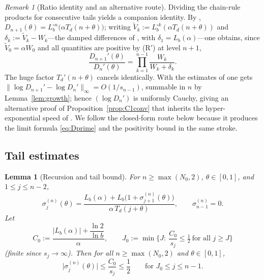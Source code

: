 \documentclass[11pt]{article}
\newtheorem{lemma}[theorem]{Lemma}
\theoremstyle{definition}
\theoremstyle{remark}
\newtheorem{remark}[theorem]{Remark}
\newcommand{\Lb}{L_{b}}
\newcommand{\Td}{T_{d}}
\begin{document}
\begin{remark}[Ratio identity and an alternative route]\label{rem:ratio}
Dividing the chain-rule products for consecutive tails yields a companion
identity. By \cite[eq.~(22)]{J}, $D_{n+1}(\theta)=\Lb^{\circ n}\big(\alpha
\Td(n+\theta)\big)$; writing $\widetilde V_k:=\Lb^{\circ k}(\alpha
\Td(n+\theta))$ and $\delta_k:=\widetilde V_k-W_k$---the damped
differences of \cite[Lemma~5.3]{J}, with $\delta_1=\Lb(\alpha)$---one
obtains, since $\widetilde V_0=\alpha W_0$ and all quantities are positive
by \textup{(R$'$)} at level $n+1$,
\[
\frac{D_{n+1}'(\theta)}{D_n'(\theta)}
=\prod_{k=1}^{n-1}\frac{W_k}{W_k+\delta_k}.
\]
The huge factor $\Td'(n+\theta)$ cancels identically. With the estimates
of \cite[Lemma~5.3]{J} one gets
$\|\log D_{n+1}'-\log D_n'\|_\infty=O(1/s_{n-1})$, summable in $n$ by
Lemma~\ref{lem:growth}; hence $(\log D_n')$ is uniformly Cauchy, giving
an alternative proof of Proposition~\ref{prop:C1conv} that inherits the
hyper-exponential speed of \cite[Lemma~5.4]{J}. We follow the closed-form
route below because it produces the limit formula \eqref{eq:Dprime} and
the positivity bound in the same stroke.
\end{remark}

\subsection{Tail estimates}

\begin{lemma}[Recursion and tail bound]\label{lem:tail}
For $n\ge\max(N_0,2)$, $\theta\in[0,1]$, and $1\le j\le n-2$,
\begin{equation}\label{eq:rec}
\sigma_j^{(n)}(\theta)
=\frac{\Lb(\alpha)+\Lb\big(1+\sigma_{j+1}^{(n)}(\theta)\big)}
{\alpha\,\Td(j+\theta)} ,
\qquad \sigma_{n-1}^{(n)}=0 .
\end{equation}
Let
\[
C_0:=\frac{|\Lb(\alpha)|+\dfrac{\ln 2}{\ln b}}{\alpha},
\qquad
J_0:=\min\Big\{J:\ \frac{C_0}{s_j}\le\tfrac12\ \text{for all }j\ge J\Big\}
\]
\textup{(}finite since $s_j\to\infty$\textup{)}. Then for all
$n\ge\max(N_0,2)$ and $\theta\in[0,1]$,
\begin{equation}\label{eq:tailbound}
\big|\sigma_j^{(n)}(\theta)\big|\le\frac{C_0}{s_j}\le\frac12
\qquad\text{for } J_0\le j\le n-1 .
\end{equation}
\end{lemma}
\end{document}

